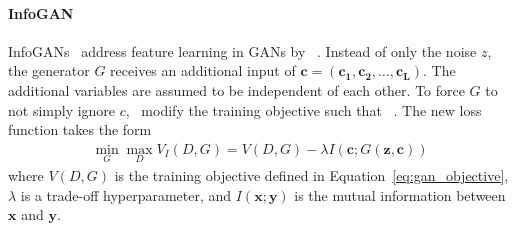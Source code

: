 \paragraph{InfoGAN}
InfoGANs~\cite{chen2016infogan} address feature learning in \acp{GAN} by ~\citep{chen2016infogan}.
Instead of only the noise $z$, the generator $G$ receives an additional input of  $\bm{c} = (\bm{c_1}, \bm{c_2}, \dots, \bm{c_L})$.
The additional variables are assumed to be independent of each other.
To force $G$ to not simply ignore $c$,~\citet{chen2016infogan} modify the training objective such that ~\citep{chen2016infogan}.
The new loss function takes the form
\begin{align}
    \min _{G} \max _{D} V_I(D, G)=V(D, G) - \lambda I(\bm{c}; G(\bm{z}, \bm{c}))
\end{align}
where $V(D, G)$ is the training objective defined in Equation~\ref{eq:gan_objective}, $\lambda$ is a trade-off hyperparameter, and $I(\bm{x}; \bm{y})$ is the mutual information between $\bm{x}$ and $\bm{y}$.

